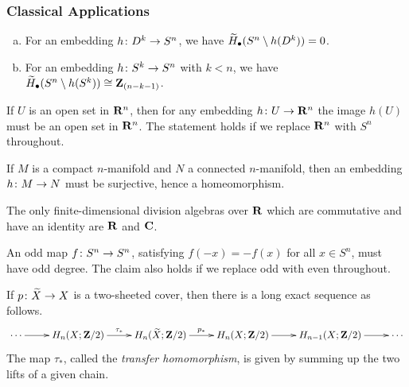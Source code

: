 \subsubsection{Classical Applications}

\begin{proposition}
  \mbox{}
  \begin{enumerate}[(a)]
  \item For an embedding $h \colon D^k \rightarrow S^n$, we have $\widetilde{H}_\bullet(S^n \setminus h(D^k)) = 0$.
  \item For an embedding $h \colon S^k \rightarrow S^n$ with $k < n$, we have $\widetilde{H}_\bullet(S^n \setminus h(S^k)) \cong \mathbf{Z}_{(n-k-1)}$.
  \end{enumerate}
\end{proposition}

\begin{theorem}
  If $U$ is an open set in $\mathbf{R}^n$, then for any embedding $h \colon U \rightarrow \mathbf{R}^n$ the image $h(U)$ must be an open set in $\mathbf{R}^n$. The statement holds if we replace $\mathbf{R}^n$ with $S^n$ throughout.
\end{theorem}

\begin{corollary}
  If $M$ is a compact $n$-manifold and $N$ a connected $n$-manifold, then an embedding $h \colon M \rightarrow N$ must be surjective, hence a homeomorphism.
\end{corollary}

\begin{theorem}[Hopf]
  The only finite-dimensional division algebras over $\mathbf{R}$ which are commutative and have an identity are $\mathbf{R}$ and $\mathbf{C}$.
\end{theorem}

\begin{proposition}
  An odd map $f \colon S^n \rightarrow S^n$, satisfying $f(-x) = -f(x)$ for all $x \in S^n$, must have odd degree. The claim also holds if we replace odd with even throughout.
\end{proposition}

\begin{proposition}
  If $p \colon \widetilde{X} \rightarrow X$ is a two-sheeted cover, then there is a long exact sequence as follows.
  \[\xymatrix{
    \cdots \ar[r] & H_n(X; \Z/2) \ar[r]^-{\tau_\ast} & H_n(\wtilde{X}; \Z/2) \ar[r]^-{p_\ast} & H_n(X; \Z/2) \ar[r] & H_{n-1}(X; \Z/2) \ar[r] & \cdots
  }\]
  The map $\tau_\ast$, called the \emph{transfer homomorphism}, is given by summing up the two lifts of a given chain.
\end{proposition}

